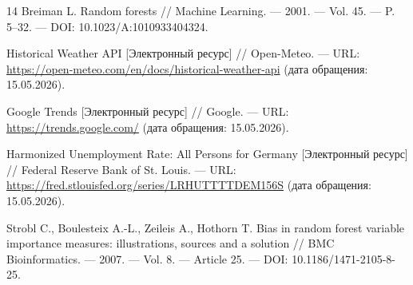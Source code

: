 \documentclass[12pt,a4paper]{article}
\numberwithin{equation}{section}
\begin{document}
\begin{thebibliography}{14}
Breiman L. Random forests // Machine Learning. --- 2001. --- Vol. 45. ---
P. 5--32. --- DOI: 10.1023/A:1010933404324.

Historical Weather API [Электронный ресурс] // Open-Meteo. ---
URL: \url{https://open-meteo.com/en/docs/historical-weather-api} (дата
обращения: 15.05.2026).

Google Trends [Электронный ресурс] // Google. ---
URL: \url{https://trends.google.com/} (дата обращения: 15.05.2026).

Harmonized Unemployment Rate: All Persons for Germany [Электронный ресурс] //
Federal Reserve Bank of St. Louis. ---
URL: \url{https://fred.stlouisfed.org/series/LRHUTTTTDEM156S} (дата обращения:
15.05.2026).

Strobl C., Boulesteix A.-L., Zeileis A., Hothorn T. Bias in random forest
variable importance measures: illustrations, sources and a solution //
BMC Bioinformatics. --- 2007. --- Vol. 8. --- Article 25. ---
DOI: 10.1186/1471-2105-8-25.

\end{thebibliography}
\end{document}
